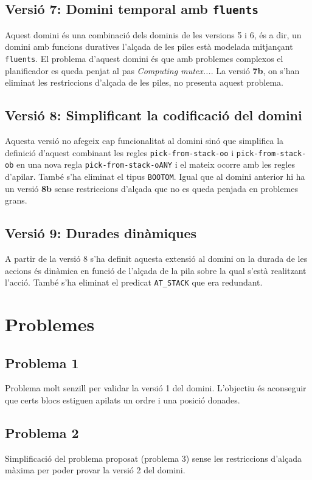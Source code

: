 \documentclass[10pt,a4paper]{article}
\begin{document}
\subsection*{Versió 7: Domini temporal amb \texttt{fluents}}
Aquest domini és una combinació dels dominis de les versions 5 i 6, és a dir, un domini amb funcions duratives
l'alçada de les piles està modelada mitjançant \texttt{fluents}. El problema d'aquest domini és que amb problemes
complexos el planificador es queda penjat al pas \textit{Computing mutex...}. La versió \textbf{7b}, on s'han eliminat
les restriccions d'alçada de les piles, no presenta aquest problema.

\subsection*{Versió 8: Simplificant la codificació del domini}
Aquesta versió no afegeix cap funcionalitat al domini sinó que simplifica la definició
d'aquest combinant les regles \texttt{pick-from-stack-oo} i \texttt{pick-from-stack-ob} en una nova regla \texttt{pick-from-stack-oANY}
i el mateix ocorre amb les regles d'apilar. També s'ha eliminat el tipus \texttt{BOOTOM}. Igual que al domini anterior hi ha un versió
\textbf{8b} sense restriccions d'alçada que no es queda penjada en problemes grans.

\subsection*{Versió 9: Durades dinàmiques}
A partir de la versió 8 s'ha definit aquesta extensió al domini on la durada de les accions és dinàmica en
funció de l'alçada de la pila sobre la qual s'està realitzant l'acció. També s'ha eliminat el predicat \texttt{AT_STACK} que era redundant.


\section*{Problemes}

\subsection*{Problema 1}
Problema molt senzill per validar la versió 1 del domini. L'objectiu és aconseguir que certs blocs estiguen
apilats un ordre i una posició donades.

\subsection*{Problema 2}
Simplificació del problema proposat (problema 3) sense les restriccions d'alçada màxima per poder provar la versió 2 del domini.
\end{document}
